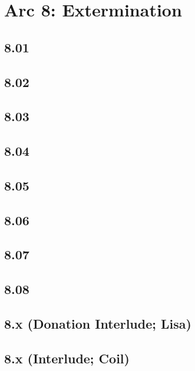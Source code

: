 \part*{Arc 8: Extermination}
 \chapter*{8.01}
 \chapter*{8.02}
 \chapter*{8.03}
 \chapter*{8.04}
 \chapter*{8.05}
 \chapter*{8.06}
 \chapter*{8.07}
 \chapter*{8.08}
 \chapter*{8.x (Donation Interlude; Lisa)}
 \chapter*{8.x (Interlude; Coil)}











